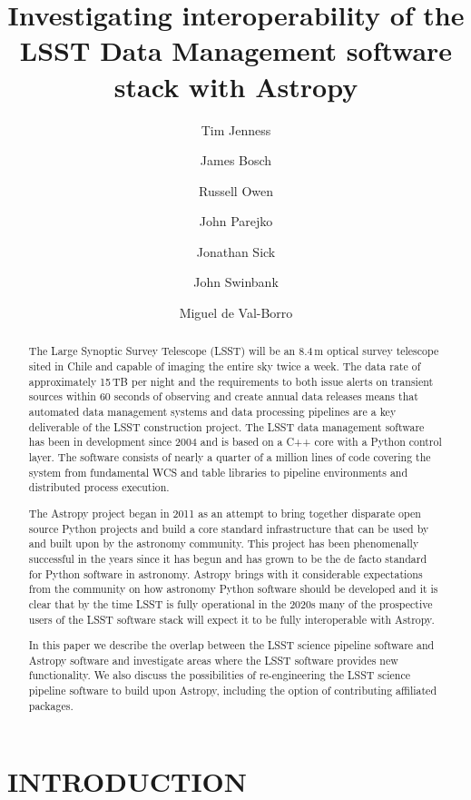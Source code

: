 \documentclass[]{spie}  %
\title{Investigating interoperability of the LSST Data Management software stack with Astropy}
\author[a]{Tim Jenness}
\author[b]{James Bosch}
\author[c]{Russell Owen}
\author[c]{John Parejko}
\author[a]{Jonathan Sick}
\author[b]{John Swinbank}
\author[b]{Miguel de Val-Borro}
\affil[a]{LSST Project Management Office, Tucson, AZ, U.S.A.}
\affil[b]{Princeton University, Princeton, NJ, U.S.A.}
\affil[c]{University of Washington, Seattle, WA, U.S.A}
\begin{document}
\maketitle

\begin{abstract}
  The Large Synoptic Survey Telescope (LSST) will be an 8.4\,m optical survey telescope sited in Chile and capable of imaging the entire sky twice a week.
  The data rate of approximately 15\,TB per night and the requirements to both issue alerts on transient sources within 60 seconds of observing and create annual data releases means that automated data management systems and data processing pipelines are a key deliverable of the LSST construction project.
  The LSST data management software has been in development since 2004 and is based on a C++ core with a Python control layer.
  The software consists of nearly a quarter of a million lines of code covering the system from fundamental WCS and table libraries to pipeline environments and distributed process execution.

  The Astropy project began in 2011 as an attempt to bring together disparate open source Python projects and build a core standard infrastructure that can be used by and built upon by the astronomy community.
  This project has been phenomenally successful in the years since it has begun and has grown to be the de facto standard for Python software in astronomy.
  Astropy brings with it considerable expectations from the community on how astronomy Python software should be developed and it is clear that by the time LSST is fully operational in the 2020s many of the prospective users of the LSST software stack will expect it to be fully interoperable with Astropy.

  In this paper we describe the overlap between the LSST science pipeline software and Astropy software and investigate areas where the LSST software provides new functionality.
  We also discuss the possibilities of re-engineering the LSST science pipeline software to build upon Astropy, including the option of contributing affiliated packages.
\end{abstract}


\section{INTRODUCTION}
\label{sec:intro}  %
\end{document}
